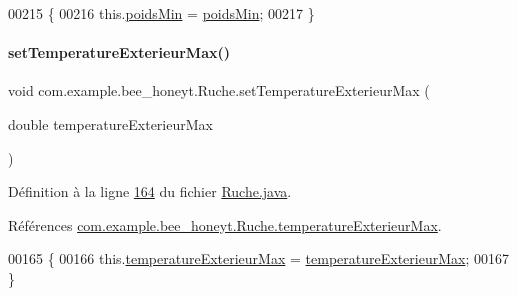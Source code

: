 \begin{DoxyCode}
00215     \{
00216         this.\hyperlink{classcom_1_1example_1_1bee__honeyt_1_1_ruche_a3408f099f2fab8700353e6e266fe8221}{poidsMin} = \hyperlink{classcom_1_1example_1_1bee__honeyt_1_1_ruche_a3408f099f2fab8700353e6e266fe8221}{poidsMin};
00217     \}
\end{DoxyCode}
\mbox{\label{classcom_1_1example_1_1bee__honeyt_1_1_ruche_a041d831cfbd058ba27d1b6901b046391}} 
\paragraph{\texorpdfstring{set\+Temperature\+Exterieur\+Max()}{setTemperatureExterieurMax()}}
{\footnotesize\ttfamily void com.\+example.\+bee\+\_\+honeyt.\+Ruche.\+set\+Temperature\+Exterieur\+Max (\begin{DoxyParamCaption}\item[{double}]{temperature\+Exterieur\+Max }\end{DoxyParamCaption})}



Définition à la ligne \hyperlink{_ruche_8java_source_l00164}{164} du fichier \hyperlink{_ruche_8java_source}{Ruche.\+java}.



Références \hyperlink{_ruche_8java_source_l00028}{com.\+example.\+bee\+\_\+honeyt.\+Ruche.\+temperature\+Exterieur\+Max}.


\begin{DoxyCode}
00165     \{
00166         this.\hyperlink{classcom_1_1example_1_1bee__honeyt_1_1_ruche_afd45ecd796457b633615488195153114}{temperatureExterieurMax} = 
      \hyperlink{classcom_1_1example_1_1bee__honeyt_1_1_ruche_afd45ecd796457b633615488195153114}{temperatureExterieurMax};
00167     \}
\end{DoxyCode}
\mbox{\label{classcom_1_1example_1_1bee__honeyt_1_1_ruche_ab93955d5269feca538027be06711413a}} 
